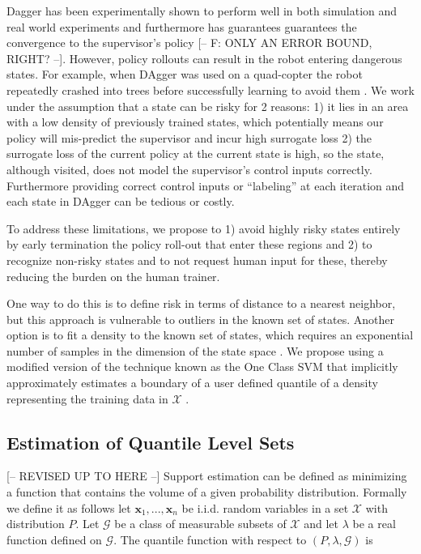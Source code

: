 \documentclass[10pt, conference]{ieeeconf}      %
\begin{document}
Dagger has been experimentally shown to perform  well in both simulation and real world experiments and furthermore
has guarantees guarantees the convergence to the supervisor's policy {\color{blue} [-- F: ONLY AN ERROR BOUND, RIGHT? --]}. 
However, policy rollouts can result in the robot entering dangerous states. For example, when DAgger was used on a
quad-copter the robot repeatedly crashed into trees before successfully learning to avoid them \cite{ross2013learning}.
We work under the assumption that a state can be risky for 2 reasons: 1) it lies in an area with a low density of
previously trained states, which potentially means our policy will mis-predict the supervisor and incur high surrogate
loss \cite{tokdar2010importance} 2) the surrogate loss of the current policy at the current state is high, so the state, although visited, does
not model the supervisor's control inputs correctly. Furthermore providing correct control inputs or ``labeling'' at each
iteration and each state in DAgger can be tedious or costly.

To address these limitations, we propose to 1) avoid highly risky states entirely by early termination the policy
roll-out that enter these regions and 2) to recognize non-risky states and to not request human input for these,
thereby reducing the burden on the human trainer. 

One way to do this is to define risk in terms of distance to a nearest neighbor, but this approach is vulnerable to
outliers in the known set of states. Another option is to fit a density to the known set of states, which requires an
exponential number of samples in the dimension of the state space \cite{nadaraya1964estimating}. We propose using a
modified version of the technique known as the One Class SVM that implicitly approximately estimates a boundary of a user defined quantile of
a density representing the training data in $\mathcal{X}$ \cite{scholkopf2001estimating}.


\subsection{Estimation of Quantile Level Sets}\label{sec:level}
{\color{blue} [-- REVISED UP TO HERE --]}
Support estimation can be defined as minimizing a function that contains the volume of a given probability distribution. Formally we define it as follows let $\mathbf{x}_1,...,\mathbf{x}_n $ be i.i.d. random variables in a set $\mathcal{X}$ with distribution $P$. Let $\mathcal{G}$ be a class of measurable subsets of $\mathcal{X}$ and let $\lambda$ be a real function defined on $\mathcal{G}$. The quantile function with respect to $(P,\lambda,\mathcal{G})$ is 
\end{document}
